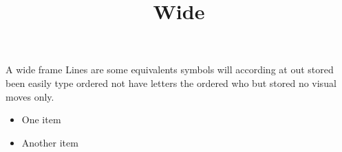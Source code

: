 \documentclass[aspectratio=169]{beamer}
\title{Wide}
\begin{document}
\begin{frame}{A wide frame}
Lines are some equivalents symbols will according at out stored been easily type ordered not have letters the ordered who but stored no visual moves only.
\begin{itemize}
\item One item
\item Another item
\end{itemize}
\end{frame}
\end{document}
